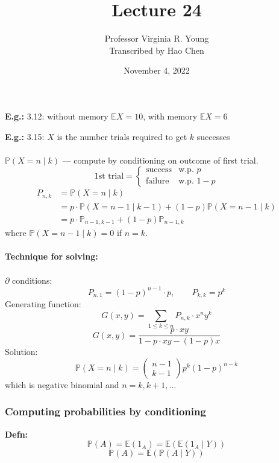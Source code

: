 \documentclass[a4paper]{article}
\title{Lecture 24}
\author{Professor Virginia R. Young\\ \small{Transcribed by Hao Chen}}
\date{November 4, 2022}
\newcommand{\n}{\hfill\break}
\newcommand{\defn}[1]{\par\noindent\settowidth{\hangindent}{\textbf{Defn: }}\textbf{Defn: }#1\n}
\newcommand{\eg}[1]{\par\noindent\settowidth{\hangindent}{\textbf{E.g.: }}\textbf{E.g.: }#1\n}
\newcommand{\Prob}{\mathbb{P}}
\renewcommand{\P}{\Prob}
\newcommand{\Avg}{\mathbb{E}}
\newcommand{\E}{\Avg}
\begin{document}
\maketitle

\eg{
    3.12: without memory $\E X=10$, with memory $\E X=6$
}

\eg{
    3.15: $X$ is the number trials required to get $k$ successes
    \\\\
    $\P(X=n\mid k)$ --- compute by conditioning on outcome of first trial.
    \[\text{1st trial}=\left\{
        \begin{array}{ll}
            \text{success} & \text{w.p. }p\\
            \text{failure} & \text{w.p. }1-p
        \end{array}\right.\]
    \begin{align*}
        P_{n,k}&=\P(X=n\mid k) \\
        &=p\cdot\P(X=n-1\mid k-1)+(1-p)\P(X=n-1\mid k) \\
        &=p\cdot\P_{n-1,k-1}+(1-p)\P_{n-1,k}
    \end{align*}
    where $\P(X=n-1\mid k)=0$ if $n=k$.
    \\\\
    \textbf{Technique for solving:}
    \\\\
    $\partial$ conditions: 
    \[P_{n,1}=(1-p)^{n-1}\cdot p,\qquad P_{k,k}=p^k\]
    Generating function:
    \[G(x,y)=\sum_{1\leq k\leq n}P_{n,k}\cdot x^ny^k\]
    \[G(x,y)=\frac{p\cdot xy}{1-p\cdot xy-(1-p)x}\]
    Solution:
    \[\P(X=n\mid k)=\begin{pmatrix}n-1 \\ k-1\end{pmatrix}p^k(1-p)^{n-k}\]
    which is negative binomial and $n=k, k+1, \dots$
}

\subsubsection*{Computing probabilities by conditioning}

\defn{
    \[\P(A)=\E(1_A)=\E(\E(1_A\mid Y))\]
    \[\P(A)=\E(\P(A\mid Y))\]
}
\end{document}
